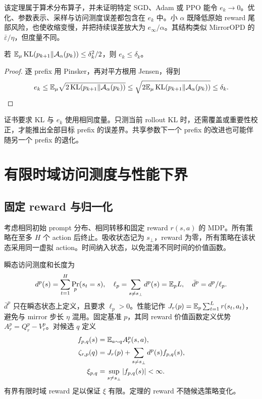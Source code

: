 该定理属于算术分布算子，并未证明特定 SGD、Adam 或 PPO 能令 $e_k\to0$。优化、参数表示、采样与访问测度误差都包含在 $e_k$ 中。小 $\alpha$ 既降低原始 reward 尾部风险，也使收缩变慢，并把持续误差放大为 $e_\infty/\alpha$。其结构类似 MirrorOPD 的 $\bar\varepsilon/\eta$，但度量不同。

\begin{corollary}[内部 KL 证书]
若 $\mathbb{E}_\mu\operatorname{KL}(p_{k+1}\Vert\mathcal A_\alpha(p_k))\leq\delta_k^2/2$，则 $e_k\leq\delta_k$。
\end{corollary}
\begin{proof}
逐 prefix 用 Pinsker，再对平方根用 Jensen，得到
\[
 e_k\leq\mathbb{E}_\mu\sqrt{2\operatorname{KL}(p_{k+1}\Vert\mathcal A_\alpha(p_k))}
 \leq\sqrt{2\mathbb{E}_\mu\operatorname{KL}(p_{k+1}\Vert\mathcal A_\alpha(p_k))}\leq\delta_k.
\]
\end{proof}
证书要求 KL 与 $e_k$ 使用相同度量。只测当前 rollout KL 时，还需覆盖或重要性校正，才能推出全部目标 prefix 的误差界。共享参数下一个 prefix 的改进也可能伴随另一个 prefix 的退化。

\section{有限时域访问测度与性能下界}
\subsection{固定 reward 与归一化}

考虑相同初始 prompt 分布、相同转移和固定 reward $r(s,a)$ 的 MDP。所有策略在至多 $H$ 个 action 后终止。吸收状态记为 $s_\bot$，reward 为零，所有策略在该状态采用同一虚拟 action。时间纳入状态，以免混淆不同时间的价值函数。

瞬态访问测度和长度为
\begin{equation}
 d^p(s)=\sum_{t=1}^H\Pr_p(s_t=s),\quad
 \ell_p=\sum_{s\ne s_\bot}d^p(s)=\mathbb{E}_pL,\quad \bar d^p=d^p/\ell_p.
 \label{eq:topd-occupancy-def}
\end{equation}
$\bar d^p$ 只在瞬态状态上定义，且要求 $\ell_p>0$。性能记作 $J_r(p)=\mathbb{E}_p\sum_{t=1}^Lr(s_t,a_t)$，避免与 mirror 步长 $\eta$ 混用。固定基准 $p$，其同 reward 价值函数定义优势 $A_r^p=Q_r^p-V_r^p$。对候选 $q$ 定义
\begin{align}
 f_{p,q}(s)&=\mathbb{E}_{a\sim q}A_r^p(s,a),\\
 \zeta_{r,p}(q)&=J_r(p)+\sum_{s\ne s_\bot}d^p(s)f_{p,q}(s),\\
 \xi_{p,q}&=\sup_{s\ne s_\bot}|f_{p,q}(s)|<\infty.
 \label{eq:topd-surrogate-def}
\end{align}
有界有限时域 reward 足以保证 $\xi$ 有限。定理的 reward 不随候选策略变化。

